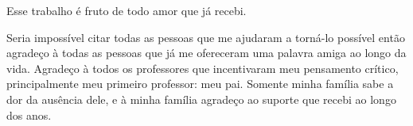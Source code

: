 \begin{agradecimentos}

Esse trabalho é fruto de todo amor que já recebi. 
\par
Seria impossível citar todas as pessoas que me ajudaram a torná-lo possível então agradeço à todas as pessoas que já me ofereceram uma palavra amiga ao longo da vida. 
Agradeço à todos os professores que incentivaram meu pensamento crítico, principalmente meu primeiro professor: meu pai. Somente minha família sabe a dor da ausência dele, e à minha família agradeço ao suporte que recebi ao longo dos anos. 

\end{agradecimentos}